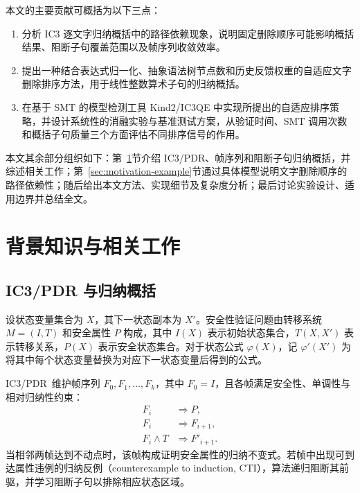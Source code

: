 \documentclass[11pt,a4paper]{article}
\begin{document}
本文的主要贡献可概括为以下三点：
\begin{enumerate}
  \item 分析 IC3 逐文字归纳概括中的路径依赖现象，说明固定删除顺序可能影响概括结果、阻断子句覆盖范围以及帧序列收敛效率。
  \item 提出一种结合表达式归一化、抽象语法树节点数和历史反馈权重的自适应文字删除排序方法，用于线性整数算术子句的归纳概括。
  \item 在基于 SMT 的模型检测工具 Kind2/IC3QE 中实现所提出的自适应排序策略，并设计系统性的消融实验与基准测试方案，从验证时间、SMT 调用次数和概括子句质量三个方面评估不同排序信号的作用。
\end{enumerate}

本文其余部分组织如下：第~\ref{sec:background}节介绍 IC3/PDR、帧序列和阻断子句归纳概括，并综述相关工作；第~\ref{sec:motivation-example}节通过具体模型说明文字删除顺序的路径依赖性；随后给出本文方法、实现细节及复杂度分析；最后讨论实验设计、适用边界并总结全文。

\section{背景知识与相关工作}
\label{sec:background}

\subsection{IC3/PDR 与归纳概括}

设状态变量集合为 $X$，其下一状态副本为 $X'$。安全性验证问题由转移系统 $M=(I,T)$ 和安全属性 $P$ 构成，其中 $I(X)$ 表示初始状态集合，$T(X,X')$ 表示转移关系，$P(X)$ 表示安全状态集合。对于状态公式 $\varphi(X)$，记 $\varphi'(X')$ 为将其中每个状态变量替换为对应下一状态变量后得到的公式。

IC3/PDR~\cite{bradley2011sat,een2011efficient}维护帧序列 $F_0,F_1,\ldots,F_k$，其中 $F_0=I$，且各帧满足安全性、单调性与相对归纳性约束：
\begin{align}
  F_i &\Rightarrow P, \label{eq:frame-safety}\\
  F_i &\Rightarrow F_{i+1}, \label{eq:frame-monotonicity}\\
  F_i\land T &\Rightarrow F'_{i+1}. \label{eq:frame-consecution}
\end{align}
当相邻两帧达到不动点时，该帧构成证明安全属性的归纳不变式。若帧中出现可到达属性违例的归纳反例（counterexample to induction, CTI），算法递归阻断其前驱，并学习阻断子句以排除相应状态区域。
\end{document}
